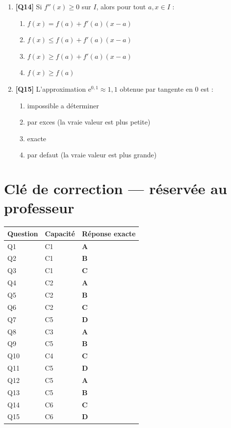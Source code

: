\begin{enumerate}
\item \textbf{[Q14]} Si $f''(x) \geq 0$ sur $I$, alors pour tout $a, x \in I$ :
  \begin{enumerate}[label=\Alph*.]
    \item $f(x) = f(a) + f'(a)(x - a)$
    \item $f(x) \leq f(a) + f'(a)(x - a)$
    \item $f(x) \geq f(a) + f'(a)(x - a)$
    \item $f(x) \geq f(a)$
  \end{enumerate}

\item \textbf{[Q15]} L'approximation $\mathrm{e}^{0{,}1} \approx 1{,}1$ obtenue par tangente en $0$ est :
  \begin{enumerate}[label=\Alph*.]
    \item impossible a déterminer
    \item par exces (la vraie valeur est plus petite)
    \item exacte
    \item par defaut (la vraie valeur est plus grande)
  \end{enumerate}

\end{enumerate}

\ifnxVersionProfesseur
\clearpage
\section*{Clé de correction — réservée au professeur}

\begin{center}
\begin{tabular}{lll}
\hline
Question & Capacité & Réponse exacte \\
\hline
Q1 & C1 & \textbf{A} \\
Q2 & C1 & \textbf{B} \\
Q3 & C1 & \textbf{C} \\
Q4 & C2 & \textbf{A} \\
Q5 & C2 & \textbf{B} \\
Q6 & C2 & \textbf{C} \\
Q7 & C5 & \textbf{D} \\
Q8 & C3 & \textbf{A} \\
Q9 & C5 & \textbf{B} \\
Q10 & C4 & \textbf{C} \\
Q11 & C5 & \textbf{D} \\
Q12 & C5 & \textbf{A} \\
Q13 & C5 & \textbf{B} \\
Q14 & C6 & \textbf{C} \\
Q15 & C6 & \textbf{D} \\
\hline
\end{tabular}
\end{center}

